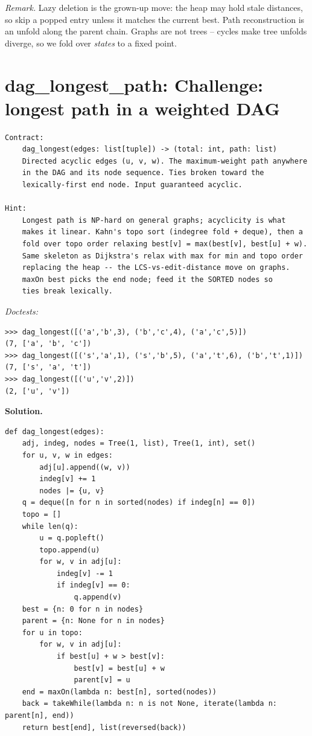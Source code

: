 \documentclass[11pt,letterpaper]{book}
\begin{document}
\noindent\textit{Remark.} Lazy deletion is the grown-up move: the heap may hold stale
distances, so skip a popped entry unless it matches the current best. Path
reconstruction is an unfold along the parent chain. Graphs are not trees --
cycles make tree unfolds diverge, so we fold over \emph{states} to a fixed
point.

\section{dag\_longest\_path: Challenge: longest path in a weighted DAG}
\begin{lstlisting}[style=spec]
Contract:
    dag_longest(edges: list[tuple]) -> (total: int, path: list)
    Directed acyclic edges (u, v, w). The maximum-weight path anywhere
    in the DAG and its node sequence. Ties broken toward the
    lexically-first end node. Input guaranteed acyclic.

Hint:
    Longest path is NP-hard on general graphs; acyclicity is what
    makes it linear. Kahn's topo sort (indegree fold + deque), then a
    fold over topo order relaxing best[v] = max(best[v], best[u] + w).
    Same skeleton as Dijkstra's relax with max for min and topo order
    replacing the heap -- the LCS-vs-edit-distance move on graphs.
    maxOn best picks the end node; feed it the SORTED nodes so
    ties break lexically.
\end{lstlisting}
\noindent\textit{Doctests:}
\begin{lstlisting}[style=spec]
>>> dag_longest([('a','b',3), ('b','c',4), ('a','c',5)])
(7, ['a', 'b', 'c'])
>>> dag_longest([('s','a',1), ('s','b',5), ('a','t',6), ('b','t',1)])
(7, ['s', 'a', 't'])
>>> dag_longest([('u','v',2)])
(2, ['u', 'v'])
\end{lstlisting}
\noindent\textbf{Solution.}
\begin{lstlisting}[style=code]
def dag_longest(edges):
    adj, indeg, nodes = Tree(1, list), Tree(1, int), set()
    for u, v, w in edges:
        adj[u].append((w, v))
        indeg[v] += 1
        nodes |= {u, v}
    q = deque([n for n in sorted(nodes) if indeg[n] == 0])
    topo = []
    while len(q):
        u = q.popleft()
        topo.append(u)
        for w, v in adj[u]:
            indeg[v] -= 1
            if indeg[v] == 0:
                q.append(v)
    best = {n: 0 for n in nodes}
    parent = {n: None for n in nodes}
    for u in topo:
        for w, v in adj[u]:
            if best[u] + w > best[v]:
                best[v] = best[u] + w
                parent[v] = u
    end = maxOn(lambda n: best[n], sorted(nodes))
    back = takeWhile(lambda n: n is not None, iterate(lambda n: parent[n], end))
    return best[end], list(reversed(back))
\end{lstlisting}
\end{document}
